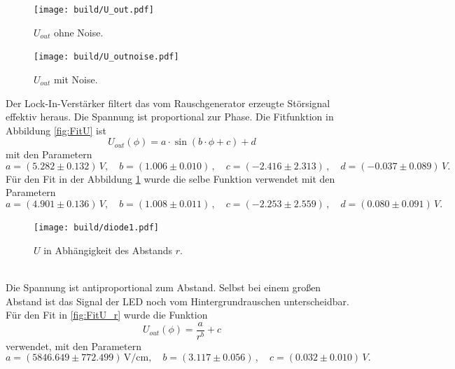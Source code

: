 \begin{figure}[H]
    \begin{minipage}[b]{.49\linewidth} %
       \texttt{[image: build/U\_out.pdf]}
       \caption{$U_{out}$ ohne Noise.}
       \label{fig:FitU}
    \end{minipage}
    \hspace{0.02\linewidth}%
    \begin{minipage}[b]{.49\linewidth} %
       \texttt{[image: build/U\_outnoise.pdf]}
       \caption{$U_{out}$ mit Noise.}
       \label{fig:FitU_noise}
    \end{minipage}
\end{figure}
Der Lock-In-Verstärker filtert das vom Rauschgenerator erzeugte Störsignal effektiv heraus. Die Spannung ist proportional zur Phase.
Die Fitfunktion in Abbildung \ref{fig:FitU} ist
\begin{equation*}
   U_{out}(\phi) = a \cdot \sin(b\cdot\phi + c) + d
\end{equation*}
mit den Parametern
\begin{equation*}
   a = (5.282 \pm 0.132) \,\unit{V}, \quad b = (1.006 \pm 0.010) \,, \quad c = (-2.416 \pm 2.313) \,, \quad d = (-0.037 \pm 0.089) \,\unit{V}.
\end{equation*}
Für den Fit in der Abbildung \ref{fig:FitU_noise} wurde die selbe Funktion verwendet mit den Parametern
\begin{equation*}
   a = (4.901 \pm 0.136) \,\unit{V}, \quad b = (1.008 \pm 0.011) \,, \quad c = (-2.253 \pm 2.559) \,, \quad d = (0.080 \pm 0.091) \,\unit{V}.
\end{equation*}
\begin{figure}
    \centering
    \texttt{[image: build/diode1.pdf]}
    \caption{$U$ in Abhängigkeit des Abstands $r.$}
    \label{fig:FitU_r}
\end{figure}
\\
Die Spannung ist antiproportional zum Abstand. Selbst bei einem großen Abstand ist das Signal der LED noch vom Hintergrundrauschen unterscheidbar.
Für den Fit in \autoref{fig:FitU_r} wurde die Funktion 
\begin{equation*}
   U_{out}(\phi) = \frac{a}{r^b} + c
\end{equation*}
verwendet, mit den Parametern
\begin{equation*}
   a = (5846.649 \pm 772.499) \,\unit{\V\per\centi\m} , \quad b = (3.117 \pm 0.056) \, , \quad c = (0.032 \pm 0.010) \,\unit{V}.
\end{equation*}

\newpage